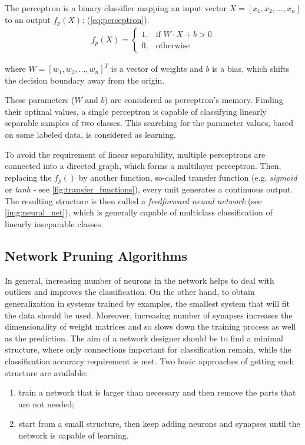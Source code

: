 The perceptron \citep{article:perceptron} is a binary classifier mapping an input vector $ X = [x_1, x_2, ..., x_n] $ to an output $ f_p(X) $; (\cref{eq:perceptron}).
\noindent
\begin{align} \label{eq:perceptron}
f_p(X) = 
\begin{cases}
    1, & \text{if }  W \cdot X + b > 0\\
    0,              & \text{otherwise}
\end{cases}
\end{align}

where $ W = [w_1, w_2, ..., w_n]^T $ is a vector of weights and $ b $ is a bias, which shifts the decision boundary away from the origin.

These parameters ($ W $ and $ b $) are considered as perceptron's memory. Finding their optimal values, a single perceptron is capable of classifying linearly separable samples of two classes. This searching for the parameter values, based on some labeled data, is considered as learning.

To avoid the requirement of linear separability, multiple perceptrons are connected into a directed graph, which forms a multilayer perceptron. Then, replacing the $ f_p() $ by another function, so-called transfer function (e.g. \textit{sigmoid} or \textit{tanh} - see \cref{fig:transfer_functions}), every unit generates a continuous output. The resulting structure is then called a \textit{feedforward neural network} (see \cref{img:neural_net}), which is generally capable of multiclass classification of linearly inseparable classes.

\subsection*{Network Pruning Algorithms} \label{sec:soa_pruning_algorithms}
In general, increasing number of neurons in the network helps to deal with outliers and improves the classification. On the other hand, to obtain generalization in systems trained by examples, the smallest system that will fit the data should be used. Moreover, increasing number of synapses increases the dimensionality of weight matrices and so slows down the training process as well as the prediction. The aim of a network designer should be to find a minimal structure, where only connections important for classification remain, while the classification accuracy requirement is met. Two basic approaches of getting such structure are available:

\begin{enumerate}
\item train a network that is larger than necessary and then remove the parts that are not needed;
\item start from a small structure, then keep adding neurons and synapses until the network is capable of learning.
\end{enumerate}

